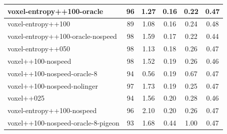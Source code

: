 \begin{table}
\begin{longtable}{|l|c|c|c|c|c|}
voxel-entropy++100-oracle & 96 & {\cellcolor[HTML]{95C9BE}} \color[HTML]{000000} 1.27 & {\cellcolor[HTML]{E8F1EF}} \color[HTML]{000000} 0.16 & {\cellcolor[HTML]{E0EDEA}} \color[HTML]{000000} 0.22 & 	{\cellcolor[HTML]{DEECE9}} \color[HTML]{000000} 0.47 \\ \hline
voxel-entropy++100 & 89 & {\cellcolor[HTML]{A3D0C7}} \color[HTML]{000000} 1.08 & {\cellcolor[HTML]{E7F0EE}} \color[HTML]{000000} 0.16 & {\cellcolor[HTML]{DCEBE8}} \color[HTML]{000000} 0.24 & 	{\cellcolor[HTML]{E5EFED}} \color[HTML]{000000} 0.48 \\ \hline
voxel-entropy++100-oracle-nospeed & 98 & {\cellcolor[HTML]{7CBDB0}} \color[HTML]{000000} 1.59 & {\cellcolor[HTML]{E3EEEC}} \color[HTML]{000000} 0.17 & {\cellcolor[HTML]{DFEDE9}} \color[HTML]{000000} 0.22 & 	{\cellcolor[HTML]{D1E5E1}} \color[HTML]{000000} 0.44 \\ \hline
voxel-entropy++050 & 98 & {\cellcolor[HTML]{A0CEC4}} \color[HTML]{000000} 1.13 & {\cellcolor[HTML]{DFEDE9}} \color[HTML]{000000} 0.18 & {\cellcolor[HTML]{D8E9E5}} \color[HTML]{000000} 0.26 & 	{\cellcolor[HTML]{DEECE9}} \color[HTML]{000000} 0.47 \\ \hline
voxel++100-nospeed & 98 & {\cellcolor[HTML]{82C0B3}} \color[HTML]{000000} 1.52 & {\cellcolor[HTML]{D9EAE6}} \color[HTML]{000000} 0.19 & {\cellcolor[HTML]{D9EAE6}} \color[HTML]{000000} 0.26 & 	{\cellcolor[HTML]{DCEBE8}} \color[HTML]{000000} 0.46 \\ \hline
voxel++100-nospeed-oracle-8 & 94 & {\cellcolor[HTML]{CCE3DE}} \color[HTML]{000000} 0.56 & {\cellcolor[HTML]{D8E9E5}} \color[HTML]{000000} 0.19 & {\cellcolor[HTML]{8FC6BB}} \color[HTML]{000000} 0.67 & 	{\cellcolor[HTML]{DFEDE9}} \color[HTML]{000000} 0.47 \\ \hline
voxel++100-nospeed-nolinger & 97 & {\cellcolor[HTML]{71B8A9}} \color[HTML]{F1F1F1} 1.73 & {\cellcolor[HTML]{D7E9E5}} \color[HTML]{000000} 0.19 & {\cellcolor[HTML]{DAEAE6}} \color[HTML]{000000} 0.25 & 	{\cellcolor[HTML]{DFEDE9}} \color[HTML]{000000} 0.47 \\ \hline
voxel++025 & 94 & {\cellcolor[HTML]{7EBEB1}} \color[HTML]{000000} 1.56 & {\cellcolor[HTML]{D2E6E2}} \color[HTML]{000000} 0.20 & {\cellcolor[HTML]{D5E7E3}} \color[HTML]{000000} 0.28 & 	{\cellcolor[HTML]{DBEAE7}} \color[HTML]{000000} 0.46 \\ \hline
voxel-entropy++100-nospeed & 96 & {\cellcolor[HTML]{55AA99}} \color[HTML]{F1F1F1} 2.10 & {\cellcolor[HTML]{D1E6E1}} \color[HTML]{000000} 0.20 & {\cellcolor[HTML]{D9E9E6}} \color[HTML]{000000} 0.26 & 	{\cellcolor[HTML]{E0EDEA}} \color[HTML]{000000} 0.47 \\ \hline
voxel++100-nospeed-oracle-8-pigeon & 93 & {\cellcolor[HTML]{75BAAC}} \color[HTML]{000000} 1.68 & {\cellcolor[HTML]{55AA99}} \color[HTML]{F1F1F1} 0.44 & {\cellcolor[HTML]{55AA99}} \color[HTML]{F1F1F1} 1.00 & 	{\cellcolor[HTML]{DEECE9}} \color[HTML]{000000} 0.47 \\ \hline



\end{longtable}
\end{table}
